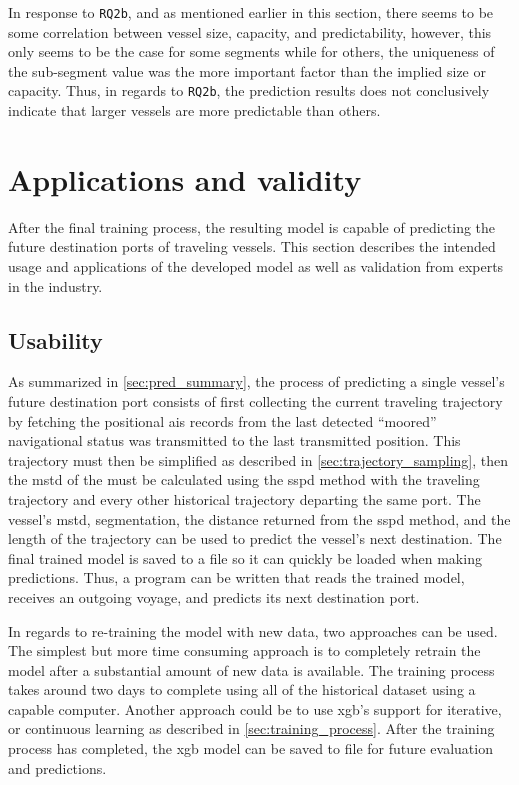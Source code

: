In response to \texttt{RQ2b}, and as mentioned earlier in this section, there seems to be some correlation between vessel size, capacity, and predictability, however, this only seems to be the case for some segments while for others, the uniqueness of the sub-segment value was the more important factor than the implied size or capacity. Thus, in regards to \texttt{RQ2b}, the prediction results does not conclusively indicate that larger vessels are more predictable than others.


\section{Applications and validity}

After the final training process, the resulting model is capable of predicting the future destination ports of traveling vessels. This section describes the intended usage and applications of the developed model as well as validation from experts in the industry.

\subsection{Usability}
\label{sec:usability}

As summarized in \cref{sec:pred_summary}, the process of predicting a single vessel's future destination port consists of first collecting the current traveling trajectory by fetching the positional \acrshort{ais} records from the last detected ``moored'' navigational status was transmitted to the last transmitted position. This trajectory must then be simplified as described in \cref{sec:trajectory_sampling}, then the \acrfull{mstd} of the must be calculated using the \acrshort{sspd} method with the traveling trajectory and every other historical trajectory departing the same port. The vessel's \acrshort{mstd}, segmentation, the distance returned from the \acrshort{sspd} method, and the length of the trajectory can be used to predict the vessel's next destination. The final trained model is saved to a file so it can quickly be loaded when making predictions. Thus, a program can be written that reads the trained model, receives an outgoing voyage, and predicts its next destination port.

In regards to re-training the model with new data, two approaches can be used. The simplest but more time consuming approach is to completely retrain the model after a substantial amount of new data is available. The training process takes around two days to complete using all of the historical dataset using a capable computer. Another approach could be to use \acrfull{xgb}'s support for iterative, or continuous learning as described in \cref{sec:training_process}. After the training process has completed, the \acrshort{xgb} model can be saved to file for future evaluation and predictions.

